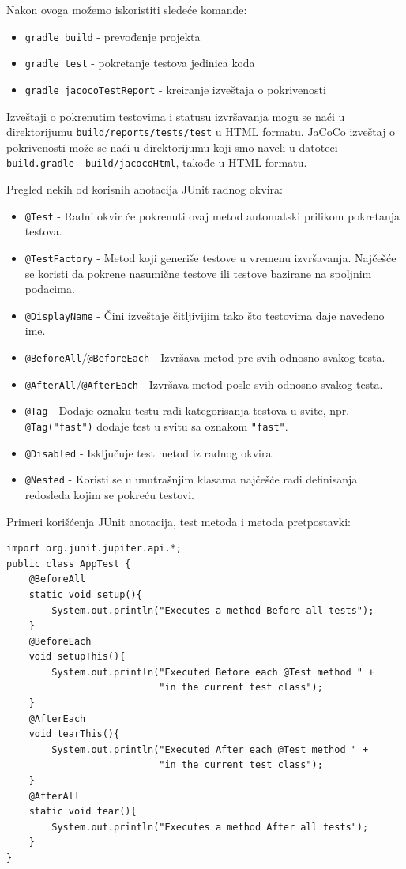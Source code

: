 Nakon ovoga možemo iskoristiti sledeće komande:

\begin{itemize}
\tightlist
\item
  \texttt{gradle\ build} - prevođenje projekta
\item
  \texttt{gradle\ test} - pokretanje testova jedinica koda
\item
  \texttt{gradle\ jacocoTestReport} - kreiranje izveštaja o pokrivenosti
\end{itemize}

Izveštaji o pokrenutim testovima i statusu izvršavanja mogu se naći u direktorijumu \texttt{build/reports/tests/test} u HTML formatu. JaCoCo izveštaj o pokrivenosti može se naći u direktorijumu koji smo naveli u datoteci \texttt{build.gradle} - \texttt{build/jacocoHtml}, takođe u HTML formatu.

Pregled nekih od korisnih anotacija JUnit radnog okvira:

\begin{itemize}
\tightlist
\item
  \texttt{@Test} - Radni okvir će pokrenuti ovaj metod automatski prilikom pokretanja testova.
\item
  \texttt{@TestFactory} - Metod koji generiše testove u vremenu izvršavanja. Najčešće se koristi da pokrene nasumične testove ili testove bazirane na spoljnim podacima.
\item
  \texttt{@DisplayName} - Čini izveštaje čitljivijim tako što testovima daje navedeno ime.
\item
  \texttt{@BeforeAll}/\texttt{@BeforeEach} - Izvršava metod pre svih odnosno svakog testa.
\item
  \texttt{@AfterAll}/\texttt{@AfterEach} - Izvršava metod posle svih odnosno svakog testa.
\item
  \texttt{@Tag} - Dodaje oznaku testu radi kategorisanja testova u svite, npr. \texttt{@Tag("fast")} dodaje test u svitu sa oznakom \texttt{"fast"}.
\item
  \texttt{@Disabled} - Isključuje test metod iz radnog okvira.
\item
  \texttt{@Nested} - Koristi se u unutrašnjim klasama najčešće radi definisanja redosleda kojim se pokreću testovi.
\end{itemize}

Primeri korišćenja JUnit anotacija, test metoda i metoda pretpostavki:

\begin{verbatim}
import org.junit.jupiter.api.*;
public class AppTest {
    @BeforeAll
    static void setup(){
        System.out.println("Executes a method Before all tests");
    }
    @BeforeEach
    void setupThis(){
        System.out.println("Executed Before each @Test method " +
                           "in the current test class");
    }
    @AfterEach
    void tearThis(){
        System.out.println("Executed After each @Test method " +
                           "in the current test class");
    }
    @AfterAll
    static void tear(){
        System.out.println("Executes a method After all tests");
    }
}
\end{verbatim}

